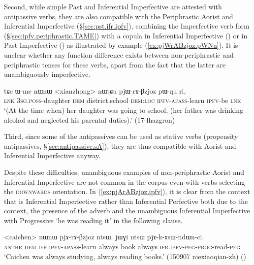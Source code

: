 Second, while simple Past and Inferential Imperfective are attested with antipassive verbs, they are also compatible with the Periphrastic Aorist and Inferential Imperfective (§\ref{sec:pst.ifr.ipfv}), combining the Imperfective verb form (§\ref{sec:ipfv.periphrastic.TAME}) with a copula in Inferential Imperfective () or in Past Imperfective () as illustrated by example (\ref{ex:pjWrABzjoz.pWNu}). It is unclear whether any function difference exists between non-periphrastic and periphrastic tenses for these verbs, apart from the fact that the latter are unambiguously imperfective.
 
\begin{exe}
\ex \label{ex:pjWrABzjoz.pWNu}
\gll tɕe ɯ-me nɯnɯ <xianzhong> nɯtɕu pjɯ-rɤ-βzjoz pɯ-ŋu ri, \\
\textsc{lnk} \textsc{3sg}.\textsc{poss}-daughter \textsc{dem} district.school \textsc{dem}:\textsc{loc} \textsc{ipfv}-\textsc{apass}-learn \textsc{ipfv}-be \textsc{lnk} \\
\glt `(At the time when) her daughter was going to school, (her father was drinking alcohol and neglected his parental duties).' (17-lhazgron)
\end{exe}

Third, since some of the  antipassives can be used as stative verbs (propensity antipassives, §\ref{sec:antipassive.sA}), they are thus compatible with Aorist and Inferential Imperfective anyway.

Despite these difficulties, unambiguous examples of  non-periphrastic Aorist and Inferential Imperfective are not common  in the corpus even with verbs selecting the \textsc{downwards} orientation. In (\ref{ex:pjArABzjoz.ipfv}), it is clear from the context that  is Inferential Imperfective rather than Inferential Perfective both due to the context, the presence of the adverb  and the unambiguous  Inferential Imperfective with Progressive  `he was reading it' in the following clause.

\begin{exe}
\ex \label{ex:pjArABzjoz.ipfv}
\gll <caichen> nɯnɯ pjɤ-rɤ-βzjoz ntsɯ. jɯɣi ntsɯ pjɤ-k-ɤsɯ-ndɯn-ci. \\
\textsc{anthr} \textsc{dem} \textsc{ifr}.\textsc{ipfv}-\textsc{apass}-learn always book always \textsc{ifr}.\textsc{ipfv}-\textsc{peg}-\textsc{prog}-read-\textsc{peg} \\
\glt `Caichen was always studying, always reading books.' (150907 niexiaoqian-zh) ()
\end{exe}

